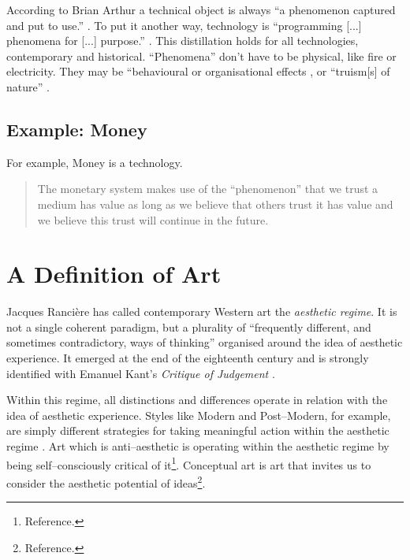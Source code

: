 \documentclass[letter:wpaper]{article}
\begin{document}
    According to Brian Arthur a technical object is always ``a phenomenon captured and put to use.'' \citep[p.53]{theNatureOfTechnology2009}. To put it another way, technology is ``programming [...] phenomena for [...] purpose.'' \citep[p.53]{theNatureOfTechnology2009}. This distillation holds for all technologies, contemporary and historical. ``Phenomena'' don't have to be physical, like fire or electricity. They may be ``behavioural or organisational  effects \citep[p.55]{theNatureOfTechnology2009}, or ``truism[s] of nature'' \citep[p.45]{theNatureOfTechnology2009}.

    \subsection{Example: Money}

    For example, Money is a technology.

    \begin{quote}
        The monetary system makes use of the ``phenomenon'' that we trust a medium has value as long as we believe that others trust it has value and we believe this trust will continue in the future. \citep[p.55]{theNatureOfTechnology2009}
    \end{quote}

\section{A Definition of Art}

    Jacques Rancière has called contemporary Western art the \emph{aesthetic regime}. It is not a single coherent paradigm, but a plurality of ``frequently different, and sometimes contradictory, ways of thinking'' \citep[p.8]{RanciereMdrnTms2022} organised around the idea of aesthetic experience. It emerged at the end of the eighteenth century and is strongly identified with Emanuel Kant's \emph{Critique of Judgement} \citep[pp.23–24]{RancierPltcsOfThAsthtcs2004}. 

    Within this regime, all distinctions and differences operate in relation with the idea of aesthetic experience. Styles like Modern and Post–Modern, for example, are simply different strategies for taking meaningful action within the aesthetic regime \citep[p213]{ZepkeSblmArt2017}. Art which is anti–aesthetic is operating within the aesthetic regime by being self–consciously critical of it\footnote{
        Reference.
    }. Conceptual art is art that invites us to consider the aesthetic potential of ideas\footnote{
        Reference.
    }.
\end{document}
